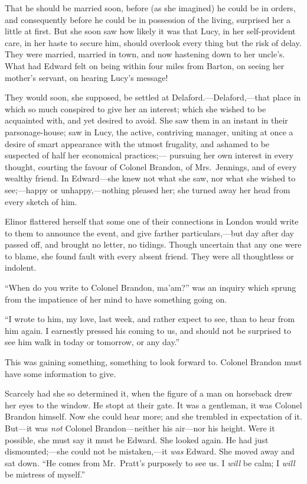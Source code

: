 \documentclass{article}
\begin{document}
That he should be married soon, before (as she imagined)
he could be in orders, and consequently before he could
be in possession of the living, surprised her a little
at first.  But she soon saw how likely it was that Lucy,
in her self-provident care, in her haste to secure him,
should overlook every thing but the risk of delay.
They were married, married in town, and now hastening
down to her uncle's.  What had Edward felt on being within
four miles from Barton, on seeing her mother's servant,
on hearing Lucy's message!

They would soon, she supposed, be settled at
Delaford.---Delaford,---that place in which so much
conspired to give her an interest; which she wished
to be acquainted with, and yet desired to avoid.
She saw them in an instant in their parsonage-house; saw
in Lucy, the active, contriving manager, uniting at once
a desire of smart appearance with the utmost frugality,
and ashamed to be suspected of half her economical practices;---%
pursuing her own interest in every thought, courting the
favour of Colonel Brandon, of Mrs.\ Jennings, and of every
wealthy friend.  In Edward---she knew not what she saw,
nor what she wished to see;---happy or unhappy,---nothing
pleased her; she turned away her head from every sketch of him.

Elinor flattered herself that some one of their
connections in London would write to them to announce
the event, and give farther particulars,---but day after
day passed off, and brought no letter, no tidings.
Though uncertain that any one were to blame, she found
fault with every absent friend.  They were all thoughtless
or indolent.

``When do you write to Colonel Brandon, ma'am?''
was an inquiry which sprung from the impatience
of her mind to have something going on.

``I wrote to him, my love, last week, and rather
expect to see, than to hear from him again.  I earnestly
pressed his coming to us, and should not be surprised
to see him walk in today or tomorrow, or any day.''

This was gaining something, something to look forward to.
Colonel Brandon must have some information to give.

Scarcely had she so determined it, when the figure
of a man on horseback drew her eyes to the window.
He stopt at their gate.  It was a gentleman, it
was Colonel Brandon himself.  Now she could hear more;
and she trembled in expectation of it.  But---it was
\emph{not} Colonel Brandon---neither his air---nor his height.
Were it possible, she must say it must be Edward.
She looked again.  He had just dismounted;---she could not be
mistaken,---it \emph{was} Edward.  She moved away and sat down.
``He comes from Mr.\ Pratt's purposely to see us.  I \emph{will} be
calm; I \emph{will} be mistress of myself.''
\end{document}
